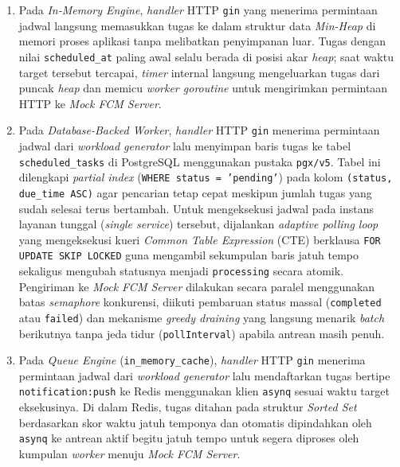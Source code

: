 \begin{enumerate}[noitemsep]
	\item Pada \textit{In-Memory Engine}, \textit{handler} HTTP \texttt{gin} yang menerima permintaan jadwal langsung memasukkan tugas ke dalam struktur data \textit{Min-Heap} di memori proses aplikasi tanpa melibatkan penyimpanan luar. Tugas dengan nilai \texttt{scheduled\_at} paling awal selalu berada di posisi akar \textit{heap}; saat waktu target tersebut tercapai, \textit{timer} internal langsung mengeluarkan tugas dari puncak \textit{heap} dan memicu \textit{worker goroutine} untuk mengirimkan permintaan HTTP ke \textit{Mock FCM Server}.
	\item Pada \textit{Database-Backed Worker}, \textit{handler} HTTP \texttt{gin} menerima permintaan jadwal dari \textit{workload generator} lalu menyimpan baris tugas ke tabel \texttt{scheduled\_tasks} di PostgreSQL menggunakan pustaka \texttt{pgx/v5}. Tabel ini dilengkapi \textit{partial index} (\texttt{WHERE status = 'pending'}) pada kolom \texttt{(status, due\_time ASC)} agar pencarian tetap cepat meskipun jumlah tugas yang sudah selesai terus bertambah. Untuk mengeksekusi jadwal pada instans layanan tunggal (\textit{single service}) tersebut, dijalankan \textit{adaptive polling loop} yang mengeksekusi kueri \textit{Common Table Expression} (CTE) berklausa \texttt{FOR UPDATE SKIP LOCKED} guna mengambil sekumpulan baris jatuh tempo sekaligus mengubah statusnya menjadi \texttt{processing} secara atomik. Pengiriman ke \textit{Mock FCM Server} dilakukan secara paralel menggunakan batas \textit{semaphore} konkurensi, diikuti pembaruan status massal (\texttt{completed} atau \texttt{failed}) dan mekanisme \textit{greedy draining} yang langsung menarik \textit{batch} berikutnya tanpa jeda tidur (\texttt{pollInterval}) apabila antrean masih penuh.
	\item Pada \textit{Queue Engine} (\texttt{in\_memory\_cache}), \textit{handler} HTTP \texttt{gin} menerima permintaan jadwal dari \textit{workload generator} lalu mendaftarkan tugas bertipe \texttt{notification:push} ke Redis menggunakan klien \texttt{asynq} sesuai waktu target eksekusinya. Di dalam Redis, tugas ditahan pada struktur \textit{Sorted Set} berdasarkan skor waktu jatuh temponya dan otomatis dipindahkan oleh \texttt{asynq} ke antrean aktif begitu jatuh tempo untuk segera diproses oleh kumpulan \textit{worker} menuju \textit{Mock FCM Server}.
\end{enumerate}

